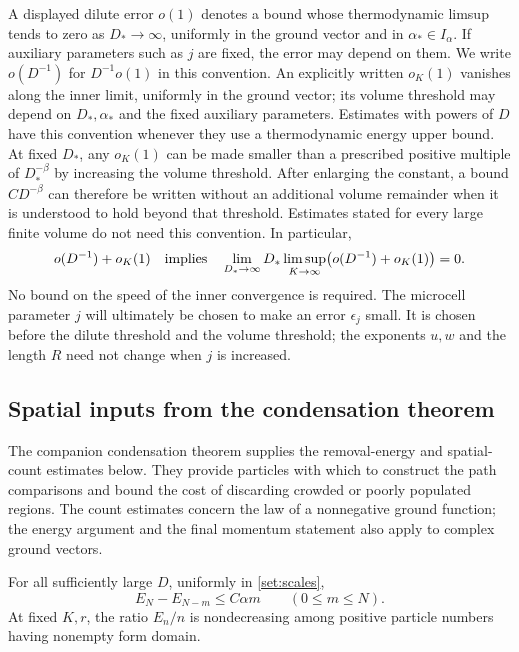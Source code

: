A displayed dilute error $o(1)$ denotes a bound whose thermodynamic
limsup tends to zero as $D_*\to\infty$, uniformly in the ground vector
and in $\alpha_*\in I_\alpha$. If auxiliary parameters such as $j$ are
fixed, the error may depend on them. We write $o(D^{-1})$ for
$D^{-1}o(1)$ in this convention. An explicitly written $o_K(1)$
vanishes along the inner limit, uniformly in the ground vector; its
volume threshold may depend on $D_*,\alpha_*$ and the fixed auxiliary
parameters. Estimates with powers of $D$ have this convention whenever
they use a thermodynamic energy upper bound. At fixed $D_*$, any
$o_K(1)$ can be made smaller than a prescribed positive multiple of
$D_*^{-\beta}$ by increasing the volume threshold. After enlarging the
constant, a bound $CD^{-\beta}$ can therefore be written without an
additional volume remainder when it is understood to hold beyond that
threshold. Estimates stated for every large finite volume do not need
this convention. In particular,
\begin{equation}\label{set:limit-order}
 o(D^{-1})+o_K(1)
 \quad\hbox{implies}\quad
 \lim_{D_*\to\infty}D_*
       \limsup_{K\to\infty}\bigl(o(D^{-1})+o_K(1)\bigr)=0.
\end{equation}
No bound on the speed of the inner convergence is required.
The microcell parameter $j$ will ultimately be chosen to make an error
$\epsilon_j$ small. It is chosen before the dilute threshold and the
volume threshold; the exponents $u,w$ and the length $R$ need not change
when $j$ is increased.

\subsection{Spatial inputs from the condensation theorem}

The companion condensation theorem \cite{H} supplies the removal-energy
and spatial-count estimates below. They provide particles with which to
construct the path comparisons and bound the cost of discarding crowded
or poorly populated regions. The count estimates concern the law of a
nonnegative ground function; the energy argument and the final momentum
statement also apply to complex ground vectors.

\begin{proposition}\label{set:removal}
For all sufficiently large $D$, uniformly in \eqref{set:scales},
\begin{equation}\label{set:removal-bound}
 E_N-E_{N-m}\le C\alpha m\qquad(0\le m\le N).
\end{equation}
At fixed $K,r$, the ratio $E_n/n$ is nondecreasing among positive
particle numbers having nonempty form domain.
\end{proposition}

